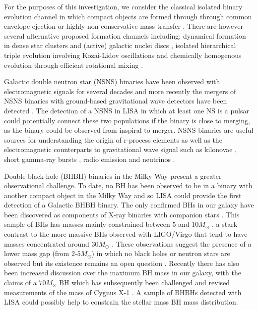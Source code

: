 For the purposes of this investigation, we consider the classical isolated binary evolution channel \citep[e.g.][]{Tutukov+1973,Tutukov+1993,Smarr+1976,Srinivasan+1989,Kalogera+2007,Belczynski+2016} in which compact objects are formed through through common envelope ejection or highly non-conservative mass transfer \citep{Heuvel+2011}. There are however several alternative proposed formation channels including: dynamical formation in dense star clusters \citep[e.g.][]{Sigurdsson+1993,PortegiesZwart+2000,Miller+2009,Rodriguez+2015} and (active) galactic nuclei discs \citep[e.g.][]{Morris+1993, Antonini+2016, McKernan+2020}, isolated hierarchical triple evolution involving Kozai-Lidov oscillations \citep[e.g.][]{Stephan+2016, Silsbee+2017,Antonini+2017} and chemically homogenous evolution through efficient rotational mixing \citep[e.g.][]{deMink+2009, deMink+2016,Marchant+2016,duBuisson+2020}.

Galactic double neutron star (NSNS) binaries have been observed with electromagnetic signals for several decades \citep[e.g.][]{Hulse+1975, Tauris+2017,Vigna-Gomez+2018} and more recently the mergers of NSNS binaries with ground-based gravitational wave detectors have been detected \citep[e.g.][]{Abbott+2017_NSNS}. The detection of a NSNS in LISA in which at least one NS is a pulsar could potentially connect these two populations if the binary is close to merging, as the binary could be observed from inspiral to merger. NSNS binaries are useful sources for understanding the origin of r-process elements \citep[e.g.][]{Eichler+1989} as well as the electromagnetic counterparts to gravitational wave signal such as kilonovae \citep[e.g.][]{Metzger+2017}, short gamma-ray bursts \citep[e.g.][]{Gompertz+2020}, radio emission \citep[e.g.][]{Hotokezaka+2016} and neutrinos \citep[e.g.][]{Kyutoku+2018}.

Double black hole (BHBH) binaries in the Milky Way present a greater observational challenge. To date, no BH has been observed to be in a binary with another compact object in the Milky Way and so LISA could provide the first detection of a Galactic BHBH binary. The only confirmed BHs in our galaxy have been discovered as components of X-ray binaries with companion stars \citep[e.g.][]{Bolton+1972,Webster+1972}. This sample of BHs has masses mainly constrained between $5$ and $10 \unit{M_\odot}$ \citep{Corral-Santana+2016}, a stark contrast to the more massive BHs observed with LIGO/Virgo that tend to have masses concentrated around $30 \unit{M_{\odot}}$ \citep{Abbott+2020_GWTC2}. These observations suggest the presence of a lower mass gap (from $2$-$5 \unit{M_{\odot}}$) in which no black holes or neutron stars are observed \citep{Ozel+2010,Farr+2011} but its existence remains an open question \citep[e.g.][]{Kreidberg+2012}. Recently there has also been increased discussion over the maximum BH mass in our galaxy, with the claims of a $70 \unit{M_{\odot}}$ BH \citep{Liu+2019} which has subsequently been challenged \citep{El-Badry+2020, Abdul-Masih+2020, Shenar+2020,Eldridge+2020} and revised measurements of the mass of Cygnus X-1 \citep{Miller-Jones+2021}. A sample of BHBHs detected with LISA could possibly help to constrain the stellar mass BH mass distribution.

